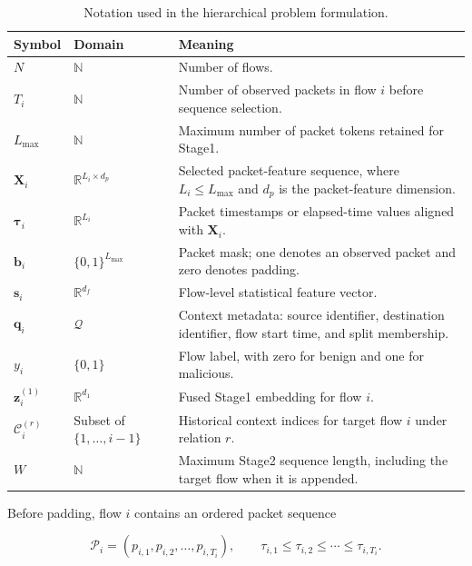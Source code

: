 \documentclass[11pt,fleqn]{report}
\begin{document}
\begin{table}[H]
\centering
\caption{Notation used in the hierarchical problem formulation.}
\label{tab:problem_notation}
\small
\setlength{\tabcolsep}{5pt}
\renewcommand{\arraystretch}{1.15}
\begin{tabular}{@{}p{2.3cm}p{3.2cm}p{9.7cm}@{}}
\toprule
\textbf{Symbol} & \textbf{Domain} & \textbf{Meaning} \\
\midrule
$N$ & $\mathbb{N}$ & Number of flows. \\
$T_i$ & $\mathbb{N}$ & Number of observed packets in flow $i$ before sequence selection. \\
$L_{\max}$ & $\mathbb{N}$ & Maximum number of packet tokens retained for Stage1. \\
$\mathbf{X}_i$ & $\mathbb{R}^{L_i\times d_p}$ & Selected packet-feature sequence, where $L_i\leq L_{\max}$ and $d_p$ is the packet-feature dimension. \\
$\boldsymbol{\tau}_i$ & $\mathbb{R}^{L_i}$ & Packet timestamps or elapsed-time values aligned with $\mathbf{X}_i$. \\
$\mathbf{b}_i$ & $\{0,1\}^{L_{\max}}$ & Packet mask; one denotes an observed packet and zero denotes padding. \\
$\mathbf{s}_i$ & $\mathbb{R}^{d_f}$ & Flow-level statistical feature vector. \\
$\mathbf{q}_i$ & $\mathcal{Q}$ & Context metadata: source identifier, destination identifier, flow start time, and split membership. \\
$y_i$ & $\{0,1\}$ & Flow label, with zero for benign and one for malicious. \\
$\mathbf{z}^{(1)}_i$ & $\mathbb{R}^{d_1}$ & Fused Stage1 embedding for flow $i$. \\
$\mathcal{C}^{(r)}_i$ & Subset of $\{1,\ldots,i-1\}$ & Historical context indices for target flow $i$ under relation $r$. \\
$W$ & $\mathbb{N}$ & Maximum Stage2 sequence length, including the target flow when it is appended. \\
\bottomrule
\end{tabular}
\end{table}

Before padding, flow $i$ contains an ordered packet sequence

\begin{equation}
\mathcal{P}_i=
\left(p_{i,1},p_{i,2},\ldots,p_{i,T_i}\right),
\qquad
\tau_{i,1}\leq\tau_{i,2}\leq\cdots\leq\tau_{i,T_i}.
\end{equation}
\end{document}

